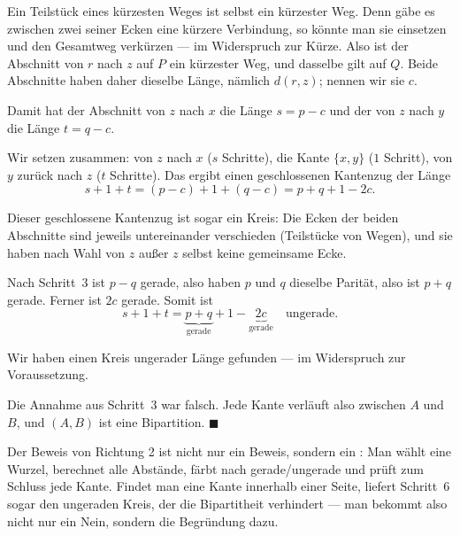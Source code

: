 \begin{merksatz}
Ein Teilstück eines kürzesten Weges ist selbst ein kürzester Weg. Denn gäbe es zwischen zwei seiner Ecken eine kürzere Verbindung, so könnte man sie einsetzen und den Gesamtweg verkürzen --- im Widerspruch zur Kürze. Also ist der Abschnitt von $r$ nach $z$ auf $P$ ein kürzester Weg, und dasselbe gilt auf $Q$. Beide Abschnitte haben daher dieselbe Länge, nämlich $d(r,z)$; nennen wir sie $c$.

Damit hat der Abschnitt von $z$ nach $x$ die Länge $s = p - c$ und der von $z$ nach $y$ die Länge $t = q - c$.

Wir setzen zusammen: von $z$ nach $x$ ($s$ Schritte), die Kante $\{x,y\}$ ($1$ Schritt), von $y$ zurück nach $z$ ($t$ Schritte). Das ergibt einen geschlossenen Kantenzug der Länge
\[ s + 1 + t = (p - c) + 1 + (q - c) = p + q + 1 - 2c . \]

Dieser geschlossene Kantenzug ist sogar ein Kreis: Die Ecken der beiden Abschnitte sind jeweils untereinander verschieden (Teilstücke von Wegen), und sie haben nach Wahl von $z$ außer $z$ selbst keine gemeinsame Ecke.

Nach Schritt~3 ist $p - q$ gerade, also haben $p$ und $q$ dieselbe Parität, also ist $p+q$ gerade. Ferner ist $2c$ gerade. Somit ist
\[ s + 1 + t = \underbrace{p+q}_{\text{gerade}} + 1 - \underbrace{2c}_{\text{gerade}} \quad \text{ungerade.} \]

Wir haben einen Kreis ungerader Länge gefunden --- im Widerspruch zur Voraussetzung.

Die Annahme aus Schritt~3 war falsch. Jede Kante verläuft also zwischen $A$ und $B$, und $(A,B)$ ist eine Bipartition. $\blacksquare$
\end{merksatz}

\begin{merksatz}
Der Beweis von Richtung 2 ist nicht nur ein Beweis, sondern ein : Man wählt eine Wurzel, berechnet alle Abstände, färbt nach gerade/ungerade und prüft zum Schluss jede Kante. Findet man eine Kante innerhalb einer Seite, liefert Schritt~6 sogar den ungeraden Kreis, der die Bipartitheit verhindert --- man bekommt also nicht nur ein Nein, sondern die Begründung dazu.

\begin{center}
\begin{minipage}{0.88\textwidth}
\end{minipage}
\end{center}
\end{merksatz}

